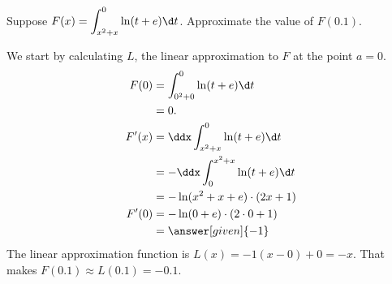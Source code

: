 \documentclass{ximera}
\begin{document}
\begin{example}
	Suppose $\displaystyle F(x) = \int^0_{x^2+x} \ln(t+e) \d t$. Approximate the value of $F(0.1)$. 
	\begin{explanation}
		We start by calculating $L$, the linear approximation to $F$ at the point $a=0$.
		\begin{align*}
			F(0) &= \int_{0^2+0}^0\ln(t+e) \d t\\
				&= 0.\\
			F'(x) &= \ddx \int_{x^2+x}^0 \ln(t+e) \d t\\
				&= - \ddx \int^{x^2+x}_0 \ln(t+e) \d t\\
				&= -\ln(x^2+x+e)\cdot (2x+1)\\
			F'(0) &= -\ln(0+e)\cdot (2\cdot 0 + 1)\\
				&= \answer[given]{-1}
		\end{align*}
		The linear approximation function is $L(x) = -1(x-0)+0 = -x$.
		That makes $F(0.1) \approx L(0.1) = -0.1$.
	\end{explanation}
\end{example}
\end{document}
